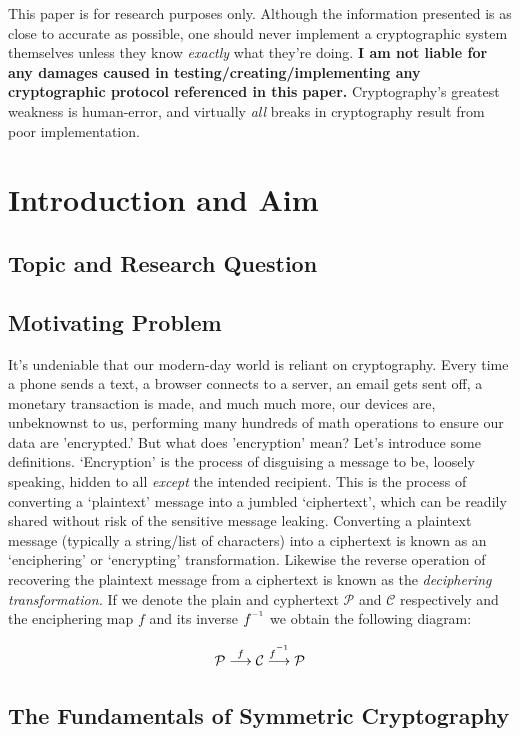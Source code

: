 \documentclass[11pt, a4paper]{report}
\newcommand{\inv}{^{\raisebox{.2em}{$\scriptscriptstyle-1$}}}
\begin{document}
This paper is for research purposes only. Although the information presented is as close to accurate as possible, one should never implement a cryptographic system themselves unless they know \textit{\emph{exactly}} what they're doing. \textbf{I am not liable for any damages caused in testing/creating/implementing any cryptographic protocol referenced in this paper.} Cryptography's greatest weakness is human-error, and virtually \textit{all} breaks in cryptography result from poor implementation.\autocite{thimbleby}

\section{Introduction and Aim}
\subsection{Topic and Research Question}

\subsection{Motivating Problem}
It's undeniable that our modern-day world is reliant on cryptography. Every time a phone sends a text, a browser connects to a server, an email gets sent off, a monetary transaction is made, and much much more, our devices are, unbeknownst to us, performing many hundreds of math operations to ensure our data are 'encrypted.' But what does 'encryption' mean? Let's introduce some definitions. ‘Encryption’ is the process of disguising a message to be, loosely speaking, hidden to all \textit{except} the intended recipient. This is the process of converting a ‘plaintext’ message into a jumbled ‘ciphertext’, which can be readily shared without risk of the sensitive message leaking. Converting a plaintext message (typically a string/list of characters) into a ciphertext is known as an ‘enciphering’ or ‘encrypting’ transformation. Likewise the reverse operation of recovering the plaintext message from a ciphertext is known as the \textit{deciphering transformation.}\autocite[54]{koblitz} If we denote the plain and cyphertext $\mathcal{P}$ and $\mathcal{C}$ respectively and the enciphering map $f$ and its inverse $f\inv$ we obtain the following diagram:

$$ \mathcal{P} \overset{f}\longrightarrow \mathcal{C} \overset{f\inv}\longrightarrow \mathcal{P} $$

\subsection{The Fundamentals of Symmetric Cryptography}
\end{document}
